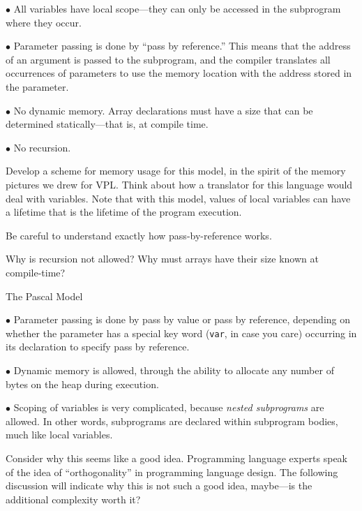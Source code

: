   \In
  \item{$\bullet$} All variables have local scope---they can only be accessed in the
  subprogram where they occur.
  \medskip

  \item{$\bullet$} Parameter passing is done by ``pass by reference.''  This means that
  the address of an argument is passed to the subprogram, and the compiler translates
  all occurrences of parameters to use the memory location with the address stored
  in the parameter.
  \medskip

  \item{$\bullet$} No dynamic memory.  Array declarations must have a size that can
  be determined statically---that is, at compile time.
  \medskip

  \item{$\bullet$} No recursion.
  \medskip
\Out

\doit Develop a scheme for memory usage for
this model, in the spirit of the
  memory pictures we drew for VPL.  Think about how a translator for this language would
  deal with variables.    Note that with this model, values of local variables can have a lifetime
  that is the lifetime of the program execution.
\medskip

\doit Be careful to understand exactly how pass-by-reference works.
\medskip

\doit  Why is recursion not allowed?  Why must arrays have
their size known at compile-time?
\border
  
{\bigboldfont The Pascal Model}
\medskip

  \In

  \item{$\bullet$} Parameter passing is done by pass by value or pass by reference, depending
  on whether the parameter has a special key word ({\tt var}, in case you care) occurring in its
  declaration to specify pass by reference.
  \medskip

  \item{$\bullet$} Dynamic memory is allowed, through the ability to 
  allocate any number of bytes on the heap during execution.
  \medskip

  \item{$\bullet$} Scoping of variables is very complicated, because {\it nested subprograms\/}
  are allowed.  In other words, subprograms are declared within subprogram bodies, much like
  local variables.
  \medskip
  
 \doit  Consider why this seems like a good idea.  Programming language experts
 speak of the idea of ``orthogonality'' in programming language design.  The following discussion
 will indicate why this is not such a good idea, maybe---is the additional complexity worth it?
 \medskip
 

